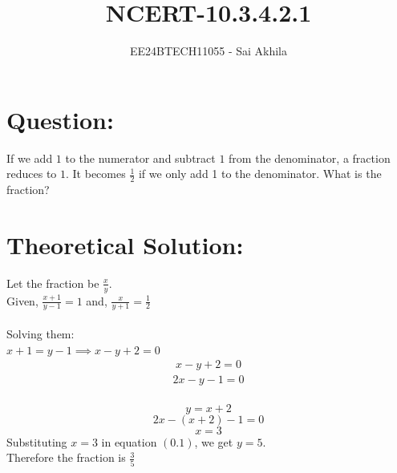 \documentclass[journal]{IEEEtran}
\begin{document}

\vspace{3cm}

\title{NCERT-10.3.4.2.1}
\author{EE24BTECH11055 - Sai Akhila}
{\let\newpage\relax\maketitle}

\renewcommand{\thefigure}{\theenumi}
\renewcommand{\thetable}{\theenumi}
\setlength{\intextsep}{10pt} %


\renewcommand{\thetable}{\theenumi}

\section*{Question:}
If we add $1$ to the numerator and subtract $1$ from the denominator, a fraction reduces to $1$. It becomes $\frac{1}{2}$ if we only add 1 to the denominator. What is the fraction?
\section*{Theoretical Solution:}
Let the fraction be $\frac{x}{y}$.\\
Given, $\frac{x+1}{y-1} = 1$ and, $\frac{x}{y+1}=\frac{1}{2}$\\\\
Solving them:\\
$x+1=y-1 \implies x-y+2=0$
\begin{align}
    x-y+2=0
\end{align}
\begin{align}
  2x-y-1=0
\end{align}\\
$$y=x+2$$
$$2x - (x+2)-1=0$$
$$x=3$$
Substituting $x=3$ in equation $(0.1)$, we get $y=5$.\\
Therefore the fraction is $\frac{3}{5}$
\end{document}

